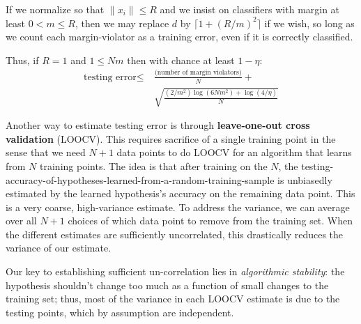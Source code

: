         If we normalize so that $\|x_i\|\leq R$ and we insist on classifiers
        with margin at least $0<m\leq R$, then we may replace $d$ by
        $\lceil 1+(R/m)^2 \rceil$ if we wish, so long as we count each
        margin-violator as a training error, even if it is correctly
        classified.


        Thus, if $R=1$ and $1 \leq Nm$ then with chance at least $1-\eta$:
        \begin{align*}
            \text{testing error} \leq &~\frac{\text{(number of margin violators)}}{N}
          +\\
            &~\sqrt{\frac{(2/m^2) \log(6N m^2) + \log(4/\eta)}{N}}
        \end{align*}



        Another way to estimate testing error is through \textbf{leave-one-out
        cross validation} (LOOCV).  This requires sacrifice of a single
        training point in the sense that we need $N+1$ data points to do LOOCV
        for an algorithm that learns from $N$ training points.
        The idea is that after training on the $N$, the
        testing-accuracy-of-hypotheses-learned-from-a-random-training-sample is
        unbiasedly estimated by the learned hypothesis's accuracy on the
        remaining data point.  This is a very coarse, high-variance estimate.
        To address the variance, we can average over all $N+1$
        choices\bcirc{}
        of which data point to remove from the training set.  When the
        different estimates are sufficiently uncorrelated, this drastically
        reduces the variance of our estimate.

        Our key to establishing sufficient un-correlation lies in
        \emph{algorithmic stability}: the hypothesis shouldn't change too much
        as a function of small changes to the training set; thus, most of the
        variance in each LOOCV estimate is due to the testing points, which by
        assumption are independent.

